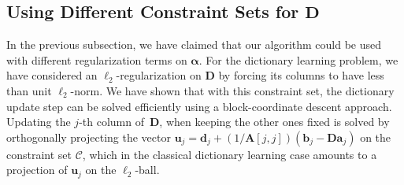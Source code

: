 \documentclass[twoside,11pt]{article}
\def\a{{\mathbf a}}
\def\alphab{{\boldsymbol\alpha}}
\def\D{{\mathbf D}}
\def\d{{\mathbf d}}
\def\C{{\mathcal C}}
\def\d{{\mathbf d}}
\def\b{{\mathbf b}}
\def\u{{\mathbf u}}
\def\u{{\mathbf u}}
\def\A{{\mathbf A}}
\begin{document}
\subsection{Using Different Constraint Sets for $\D$}
In the previous subsection, we have claimed that our algorithm could be used
with different regularization terms on $\alphab$. 
For the dictionary learning problem, we have considered an $\ell_2$-regularization
on $\D$ by forcing its columns to have less than unit $\ell_2$-norm. 
We have shown that with this constraint set, the dictionary update step 
can be solved efficiently using a block-coordinate descent approach. Updating
the $j$-th column of~$\D$, when keeping the other ones fixed is solved by 
orthogonally projecting the vector $\u_j = \d_j+(1/\A[j,j])(\b_j-\D\a_j)$
on the constraint set $\C$, which in the classical dictionary learning case
amounts to a projection of $\u_j$ on the $\ell_2$-ball. 
\end{document}
